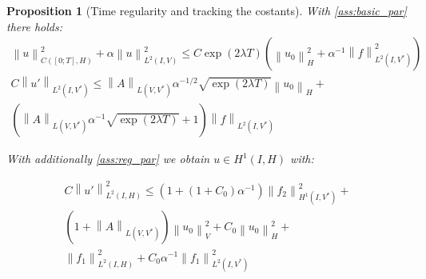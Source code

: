 \documentclass[english,a4paper,9pt,oneside]{scrbook}	%
\theoremstyle{break}
\newtheorem{thm}[equation]{Theorem}
\newtheorem{prop}[equation]{Proposition}
\newenvironment{mproof}[1][\proofname]{%
  \begin{proof}[#1]$ $\par\nobreak\ignorespaces
}{%
  \end{proof}
}
\renewcommand*{\proofname}{Proof}
\theoremstyle{remark}
\newcommand{\norm}[1]{\left\lVert#1\right\rVert}
\newcommand{\HN}[1]{\norm{#1}_{H}}
\newcommand{\VN}[1]{\norm{#1}_{V}}
\newcommand{\VSN}[1]{\norm{#1}_{V^*}}
\begin{document}
\begin{appendices}
%
%
%
%
%
%
%

\begin{prop}[Time regularity and tracking the costants]
\label{thm:const_track}
With \cref{ass:basic_par} there holds:
\begin{align}
\norm{u}^2_{C([0;T],H)}+\alpha\norm{u}_{L^2(I,V)}^2\leq C\exp(2\lambda T)(\HN{u_0}^2+\alpha^{-1}\norm{f}^2_{L^2(I,V^*)})\\
C\norm{u'}_{L^2(I,V^*)}\leq \norm{A}_{L(V,V^*)}\alpha^{-1/2}\sqrt{\exp(2\lambda T)}\HN{u_0} +\\\left (\norm{A}_{L(V,V^*)}\alpha^{-1}\sqrt{\exp(2\lambda T)}+1\right ) \norm{f}_{L^2(I,V^*)}
\end{align}

With additionally \cref{ass:reg_par} we obtain $u \in H^1(I,H)$ with:

\begin{align}
C\norm{u'}^2_{L^2(I,H)}\leq 
(1+(1+C_0)\alpha^{-1})\norm{f_2}_{H^1(I,V^*)}^2+\\
(1+\norm{A}_{L(V,V^*)})\VN{u_{0}}^2+C_0\HN{u_0}^2+\\
\norm{f_1}_{L^2(I,H)}^2+C_0\alpha^{-1}\norm{f_1}^2_{L^2(I,V^*)}
\end{align}


\end{prop}
\end{appendices}
\end{document}
